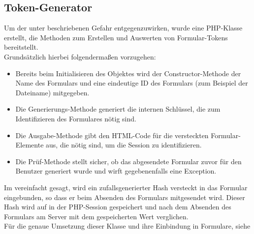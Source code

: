 \subsection{Token-Generator}
\label{sec:content_draft_token}
Um der unter  beschriebenen Gefahr entgegenzuwirken, wurde eine PHP-Klasse erstellt, die Methoden zum Erstellen und Auswerten von Formular-Tokens bereitstellt.\\
Grundsätzlich hierbei folgendermaßen vorzugehen:
\begin{itemize}
	\item Bereits beim Initialisieren des Objektes wird der Constructor-Methode der Name des Formulars und eine eindeutige ID des Formulars (zum Beispiel der Dateiname) mitgegeben.
	\item Die Generierungs-Methode generiert die internen Schlüssel, die zum Identifizieren des Formulares nötig sind.
	\item Die Ausgabe-Methode gibt den HTML-Code für die versteckten Formular-Elemente aus, die nötig sind, um die Session zu identifizieren.
	\item Die Prüf-Methode stellt sicher, ob das abgesendete Formular zuvor für den Benutzer generiert wurde und wirft gegebenenfalls eine Exception.
\end{itemize}
Im vereinfacht gesagt, wird ein zufallsgenerierter Hash versteckt in das Formular eingebunden, so dass er beim Absenden des Formulars mitgesendet wird. Dieser Hash wird auf in der PHP-Session gespeichert und nach dem Absenden des Formulars am Server mit dem gespeicherten Wert verglichen.\\
Für die genaue Umsetzung dieser Klasse und ihre Einbindung in Formulare, siehe 